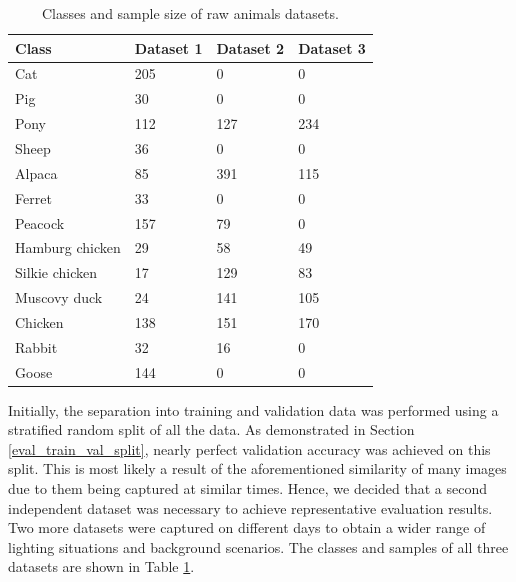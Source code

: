 \documentclass{l4proj}
\begin{document}
\begin{table}[ht]
  \centering
  \begin{tabular}{@{}llll@{}}
    \toprule
    \textbf{Class}  & \textbf{Dataset 1} & \textbf{Dataset 2} & \textbf{Dataset 3}  \\ \midrule
    Cat             & 205              & 0                    & 0                   \\ 
    Pig             & 30               & 0                    & 0                   \\
    Pony            & 112              & 127                  & 234                 \\
    Sheep           & 36               & 0                    & 0                   \\
    Alpaca          & 85               & 391                  & 115                 \\
    Ferret          & 33               & 0                    & 0                   \\
    Peacock         & 157              & 79                   & 0                   \\
    Hamburg chicken & 29               & 58                   & 49                  \\
    Silkie chicken  & 17               & 129                  & 83                  \\
    Muscovy duck    & 24               & 141                  & 105                 \\
    Chicken         & 138              & 151                  & 170                 \\
    Rabbit          & 32               & 16                   & 0                   \\
    Goose           & 144              & 0                    & 0                   \\ \bottomrule
  \end{tabular}
  \caption{Classes and sample size of raw animals datasets.}
  \label{table:raw_dataset}
\end{table}

Initially, the separation into training and validation data was performed using a stratified random split of all the data. As demonstrated in Section \ref{eval_train_val_split}, nearly perfect validation accuracy was achieved on this split. This is most likely a result of the aforementioned similarity of many images due to them being captured at similar times. Hence, we decided that a second independent dataset was necessary to achieve representative evaluation results. Two more datasets were captured on different days to obtain a wider range of lighting situations and background scenarios. The classes and samples of all three datasets are shown in Table \ref{table:raw_dataset}.
\end{document}
